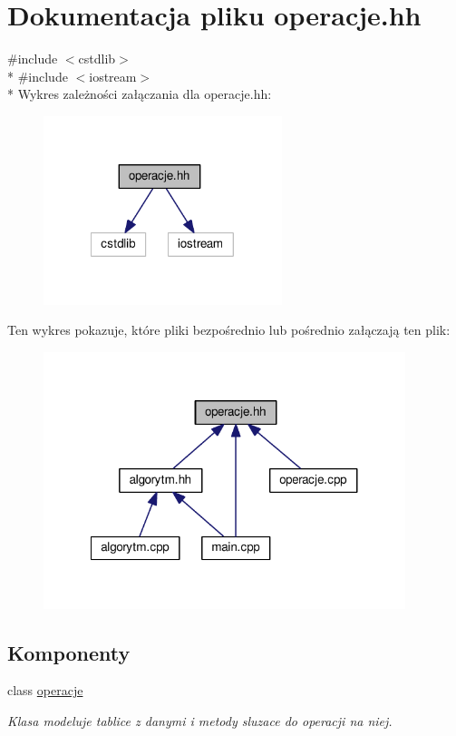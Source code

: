 \hypertarget{operacje_8hh}{\section{Dokumentacja pliku operacje.\-hh}
\label{operacje_8hh}
}
{\ttfamily \#include $<$cstdlib$>$}\\*
{\ttfamily \#include $<$iostream$>$}\\*
Wykres zależności załączania dla operacje.\-hh\-:\nopagebreak
\begin{figure}[H]
\begin{center}
\leavevmode
\includegraphics[width=197pt]{operacje_8hh__incl}
\end{center}
\end{figure}
Ten wykres pokazuje, które pliki bezpośrednio lub pośrednio załączają ten plik\-:\nopagebreak
\begin{figure}[H]
\begin{center}
\leavevmode
\includegraphics[width=299pt]{operacje_8hh__dep__incl}
\end{center}
\end{figure}
\subsection*{Komponenty}
\begin{DoxyCompactItemize}
\item 
class \hyperlink{classoperacje}{operacje}
\begin{DoxyCompactList}\small\item\em Klasa modeluje tablice z danymi i metody sluzace do operacji na niej. \end{DoxyCompactList}\end{DoxyCompactItemize}

